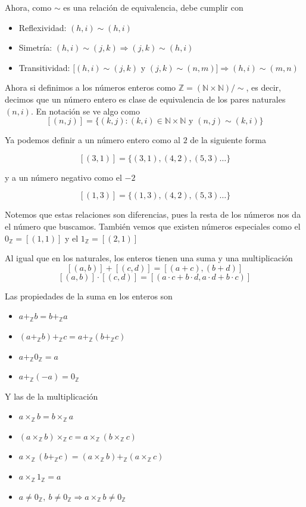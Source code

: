 \documentclass[11pt]{article}
\begin{document}
Ahora, como $\sim$ es una relación de equivalencia, debe cumplir con 
\begin{itemize}
    \item Reflexividad: $(h,i)\sim(h,i)$
    \item Simetría: $(h,i)\sim(j,k)\Longrightarrow (j,k)\sim(h,i)$
    \item Transitividad: $[(h,i)\sim(j,k)$ y $(j,k)\sim(n,m)]\Longrightarrow (h,i)\sim(m,n)$
\end{itemize}

Ahora si definimos a los números enteros como $\mathbb{Z}=(\mathbb{N}\times \mathbb{N})/\sim$, es decir, decimos que un número entero es clase de equivalencia de los pares naturales $(n,i)$. En notación se ve algo como
\[
[(n,j)]=\{(k,j):(k,i)\in \mathbb{N}\times \mathbb{N} \text{ y } (n,j)\sim(k,i)\}
\]

Ya podemos definir a un número entero como al $2$ de la siguiente forma

\[
[(3,1)]=\{(3,1),(4,2),(5,3)\dotso \}
\]

y a un número negativo como el $-2$

\[
[(1,3)]=\{(1,3),(4,2),(5,3)\dotso \}
\]

Notemos que estas relaciones son diferencias, pues la resta de los números nos da el número que buscamos. También vemos que existen números especiales como el $0_\mathbb{Z}=[(1,1)]$ y el $1_\mathbb{Z}=[(2,1)]$

Al igual que en los naturales, los enteros tienen una suma y una multiplicación
\[
[(a,b)]+[(c,d)]=[(a+c),(b+d)]
\]
\[
[(a,b)]\cdot [(c,d)]=[(a\cdot c+b\cdot d,a\cdot d+b\cdot c)]
\]

Las propiedades de la suma en los enteros son

\begin{itemize}
    \item $a+_{\mathbb Z}b=b+_{\mathbb Z}a$
    \item $(a+_{\mathbb Z}b)+_{\mathbb Z}c
    =a+_{\mathbb Z}(b+_{\mathbb Z}c)$
    \item $a+_{\mathbb Z}0_{\mathbb Z}=a$
    \item $a+_{\mathbb Z}(-a)=0_{\mathbb Z}$
\end{itemize}

Y las de la multiplicación

\begin{itemize}
    \item $a\times_{\mathbb Z}b=b\times_{\mathbb Z}a$
    \item $(a\times_{\mathbb Z}b)\times_{\mathbb Z}c
    =a\times_{\mathbb Z}(b\times_{\mathbb Z}c)$
    \item $a\times_{\mathbb Z}(b+_{\mathbb Z}c)
    =(a\times_{\mathbb Z}b)+_{\mathbb Z}(a\times_{\mathbb Z}c)$
    \item $a\times_{\mathbb Z}1_{\mathbb Z}=a$
    \item $a\neq 0_{\mathbb Z},\ b\neq 0_{\mathbb Z}
    \Longrightarrow a\times_{\mathbb Z}b\neq 0_{\mathbb Z}$
\end{itemize}
\end{document}

